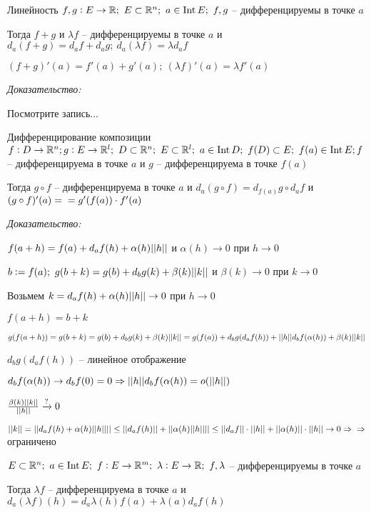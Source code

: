 \documentclass[12pt]{article}
\begin{document}
\begin{theo}{Линейность}
    $f, g : E \to \R;\ E \subset \R^n;\ a \in \Int E;\ f, g$ -- дифференцируемы в точке $a$

    Тогда $f + g$ и $\lambda f$ -- дифференцируемы в точке $a$ и $d_a(f + g) = d_a f + d_a g;\ d_a(\lambda f) = \lambda d_a f$

    $(f + g)'(a) = f'(a) + g'(a);\ (\lambda f)'(a) = \lambda f'(a)$
\end{theo}

\textit{Доказательство:}

Посмотрите запись...

\begin{theo}{Дифференцирование композиции}
    $f : D \to \mathbb R^n; g : E \to \mathbb R^l;\ D \subset \mathbb R^n;\ E \subset \mathbb R^l;\ a \in \operatorname{Int} D;\ f(D) \subset E;\ f(a) \in \operatorname{Int} E; f$ -- дифференцируема в точке $a$ и $g$ -- дифференцируема в точке $f(a)$

    Тогда $g \circ f$ -- дифференцируема в точке $a$ и $d_a(g \circ f) = d_{f(a)} g \circ d_a f$ и $(g \circ f)'(a) = \\ = g'(f(a)) \cdot f'(a)$
\end{theo}

\textit{Доказательство:}

$f(a + h) = f(a) + d_a f(h) + \alpha(h)|| h ||$ и $\alpha(h) \to 0$ при $h \to 0$

$b := f(a);\ g(b + k) = g(b) + d_b g(k) + \beta(k)|| k ||$ и $\beta(k) \to 0$ при $k \to 0$

Возьмем $k = d_af(h) + \alpha(h)|| h || \to 0$ при $h \to 0$

$f(a + h) = b + k$

$g(f(a + h)) = g(b + k) = g(b) + d_b g(k) + \beta(k)|| k || = g(f(a)) + d_b g(d_af(h)) + || h ||d_bf(\alpha(h)) + \beta(k)|| k ||$

$d_b g(d_af(h))$ -- линейное отображение 

$d_bf(\alpha(h)) \to d_bf(0) = 0 \Rightarrow || h ||d_bf(\alpha(h)) = o(|| h ||)$

$\frac{\beta(k)|| k ||}{|| h ||} \xrightarrow{?} 0$

$|| k || = || d_af(h) + \alpha(h)|| h || || \leq || d_af(h) || + || \alpha(h)|| h || || \leq || d_af || \cdot || h || + || \alpha(h) || \cdot || h || \to 0 \Rightarrow \\ \Rightarrow$ ограничено 

\begin{theo}{}
    $E \subset \mathbb R^n;\ a \in \operatorname{Int} E;\ f : E \to \mathbb R^m;\ \lambda : E \to \mathbb R;\ f, \lambda$ -- дифференцируемы в точке $a$

    Тогда $\lambda f$ -- дифференцируема в точке $a$ и $d_a(\lambda f)(h) = d_a\lambda(h)f(a) + \lambda(a)d_a f(h)$
\end{theo}
\end{document}
